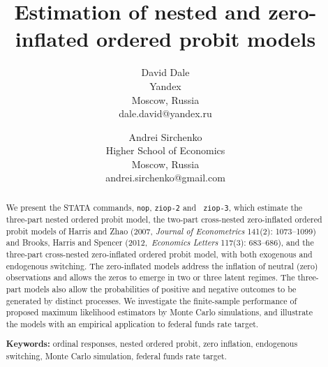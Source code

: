 \documentclass[letterpaper,fleqn,12pt]{article}
\begin{document}
\title{Estimation of nested and zero-inflated ordered probit models\\
\bigskip }
\date{}
\author{David Dale \\
Yandex\\
Moscow, Russia\\
dale.david@yandex.ru \and Andrei Sirchenko \\
Higher School of Economics\\
Moscow, Russia\\
andrei.sirchenko@gmail.com}
\maketitle

\begin{abstract}
We present the STATA commands, \texttt{nop}, \texttt{ziop-2} and \texttt{%
ziop-3}, which estimate the three-part nested ordered probit model, the
two-part cross-nested zero-inflated ordered probit models of Harris and Zhao
(2007, \textit{Journal of Econometrics }141(2): 1073--1099) and Brooks,
Harris and Spencer (2012,\ \textit{Economics Letters} 117(3): 683--686), and
the three-part cross-nested zero-inflated ordered probit model, with both
exogenous and endogenous switching. The zero-inflated models address the
inflation of neutral (zero) observations and allows the zeros to emerge in
two or three latent regimes. The three-part models also allow the
probabilities of positive and negative outcomes to be generated by distinct
processes. We investigate the finite-sample performance of proposed maximum
likelihood estimators by Monte Carlo simulations, and illustrate the models
with an empirical application to federal funds rate target.

\bigskip \bigskip \bigskip \bigskip \bigskip \bigskip \bigskip

\bigskip \bigskip \bigskip \bigskip \bigskip \bigskip \bigskip

\bigskip \bigskip \bigskip \bigskip \bigskip \bigskip \bigskip

\textbf{Keywords:} ordinal responses, nested ordered probit, zero inflation,
endogenous switching, Monte Carlo simulation, federal funds rate target.

\bigskip \bigskip \bigskip \bigskip \bigskip
\end{abstract}
\end{document}
